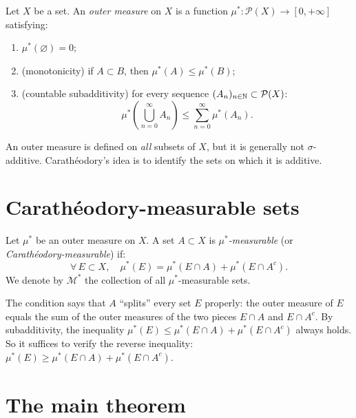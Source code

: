 \begin{definition}
Let $X$ be a set. An \emph{outer measure} on $X$ is a function
$\mu^* : \mathcal{P}(X) \to [0, +\infty]$ satisfying:
\begin{enumerate}
    \item[(i)] $\mu^*(\varnothing) = 0$;
    \item[(ii)] (monotonicity) if $A \subset B$, then $\mu^*(A) \leq \mu^*(B)$;
    \item[(iii)] (countable subadditivity) for every sequence
    $(A_n)_{n \in \mathbb{N}} \subset \mathcal{P}(X)$:
    \[
    \mu^*\!\left(\bigcup_{n=0}^{\infty} A_n\right) \leq \sum_{n=0}^{\infty}
    \mu^*(A_n).
    \]
\end{enumerate}
\end{definition}

\begin{remark}
An outer measure is defined on \emph{all} subsets of $X$, but it is generally not
$\sigma$-additive. Carath\'eodory's idea is to identify the sets on which it is
additive.
\end{remark}

\section{Carath\'eodory-measurable sets}

\begin{definition}
\label{def:caratheodory_measurable}
Let $\mu^*$ be an outer measure on $X$. A set $A \subset X$ is
\emph{$\mu^*$-measurable} (or \emph{Carath\'eodory-measurable}) if:
\[
\forall\, E \subset X, \quad \mu^*(E) = \mu^*(E \cap A) + \mu^*(E \cap A^c).
\]
We denote by $\mathcal{M}^*$ the collection of all $\mu^*$-measurable sets.
\end{definition}

\begin{intuition}[title=\textbf{Interpreting the Carath\'eodory criterion}]
The condition says that $A$ ``splits'' every set $E$ properly: the outer measure
of $E$ equals the sum of the outer measures of the two pieces $E \cap A$ and
$E \cap A^c$. By subadditivity, the inequality
$\mu^*(E) \leq \mu^*(E \cap A) + \mu^*(E \cap A^c)$ always holds. So it suffices
to verify the reverse inequality:
$\mu^*(E) \geq \mu^*(E \cap A) + \mu^*(E \cap A^c)$.
\end{intuition}

\section{The main theorem}

